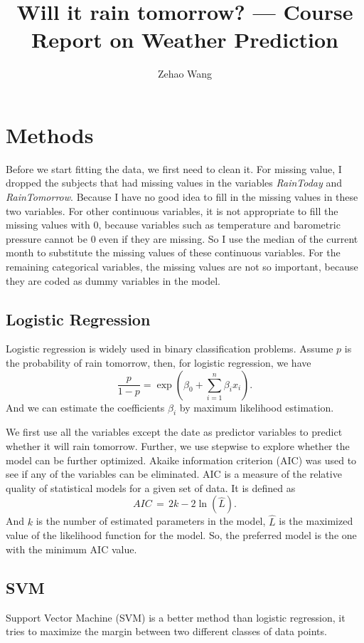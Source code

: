 \documentclass[11pt, a4paper, jou]{apa7}
\title{Will it rain tomorrow? --- Course Report on Weather Prediction}
\author{Zehao Wang}
\begin{document}
\maketitle
\section{Methods}
Before we start fitting the data, we first need to clean it. For missing value, I dropped the subjects that had missing values in the variables \emph{RainToday} and \emph{RainTomorrow}. Because I have no good idea to fill in the missing values in these two variables. For other continuous variables, it is not appropriate to fill the missing values with $0$, because variables such as temperature and barometric pressure cannot be $0$ even if they are missing. So I use the median of the current month to substitute the missing values of these continuous variables. For the remaining categorical variables, the missing values are not so important, because they are coded as dummy variables in the model. 
\subsection{Logistic Regression}
    Logistic regression\cite{Berkson1944} is widely used in binary classification problems. Assume $p$ is the probability of rain tomorrow, then, for logistic regression, we have
    \begin{equation}
        \frac{p}{1-p}=\exp\left(\beta_0+\sum_{i=1}^{n}\beta_i x_i\right). 
    \end{equation}
    And we can estimate the coefficients $\beta_i$ by maximum likelihood estimation. 

    We first use all the variables except the date as predictor variables to predict whether it will rain tomorrow. Further, we use stepwise to explore whether the model can be further optimized. Akaike information criterion (AIC)\cite{Akaike1974} was used to see if any of the variables can be eliminated. AIC is a measure of the relative quality of statistical models for a given set of data. It is defined as
    \begin{equation}
        {AIC} \,=\,2k-2\ln({\hat {L}}). 
    \end{equation}
    And $k$ is the number of estimated parameters in the model, $\hat{L}$ is the maximized value of the likelihood function for the model. So, the preferred model is the one with the minimum AIC value. 
\subsection{SVM}
    Support Vector Machine (SVM) is a better method than logistic regression, it tries to maximize the margin between two different classes of data points. 
\end{document}
